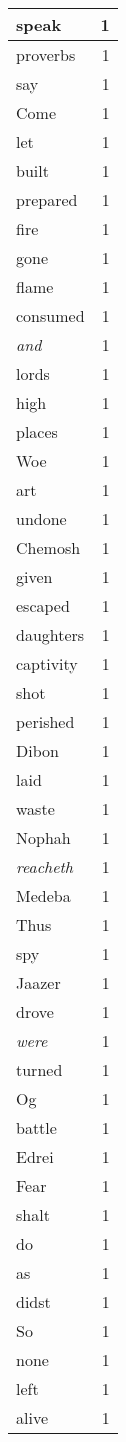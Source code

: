 \begin{center}
\begin{longtable}{l|r}
speak & 1 \\ \hline
proverbs & 1 \\ \hline
say & 1 \\ \hline
Come & 1 \\ \hline
let & 1 \\ \hline
built & 1 \\ \hline
prepared & 1 \\ \hline
fire & 1 \\ \hline
gone & 1 \\ \hline
flame & 1 \\ \hline
consumed & 1 \\ \hline
\emph{and} & 1 \\ \hline
lords & 1 \\ \hline
high & 1 \\ \hline
places & 1 \\ \hline
Woe & 1 \\ \hline
art & 1 \\ \hline
undone & 1 \\ \hline
Chemosh & 1 \\ \hline
given & 1 \\ \hline
escaped & 1 \\ \hline
daughters & 1 \\ \hline
captivity & 1 \\ \hline
shot & 1 \\ \hline
perished & 1 \\ \hline
Dibon & 1 \\ \hline
laid & 1 \\ \hline
waste & 1 \\ \hline
Nophah & 1 \\ \hline
\emph{reacheth} & 1 \\ \hline
Medeba & 1 \\ \hline
Thus & 1 \\ \hline
spy & 1 \\ \hline
Jaazer & 1 \\ \hline
drove & 1 \\ \hline
\emph{were} & 1 \\ \hline
turned & 1 \\ \hline
Og & 1 \\ \hline
battle & 1 \\ \hline
Edrei & 1 \\ \hline
Fear & 1 \\ \hline
shalt & 1 \\ \hline
do & 1 \\ \hline
as & 1 \\ \hline
didst & 1 \\ \hline
So & 1 \\ \hline
none & 1 \\ \hline
left & 1 \\ \hline
alive & 1 \\ \hline
\end{longtable}
\end{center}




